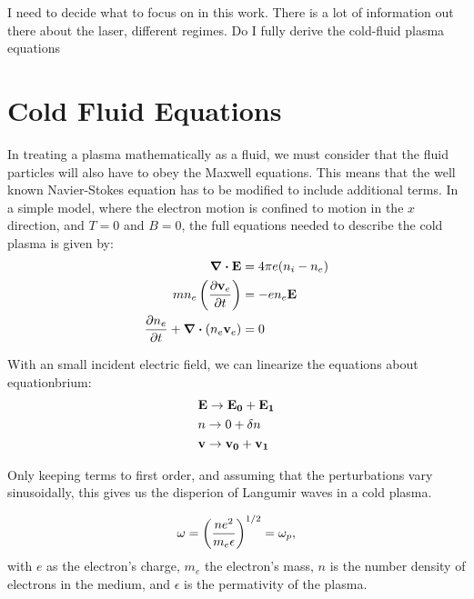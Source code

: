 \documentclass[12pt, titlepage]{article}
\begin{document}
I need to decide what to focus on in this work. There is a lot of information out there about the laser, different regimes. Do I fully derive the cold-fluid plasma equations
\section{Cold Fluid Equations}

In treating a plasma mathematically as a fluid, we must consider that the fluid particles
will also have to obey the Maxwell equations. This means that the well known Navier-Stokes
equation has to be modified to include additional terms. In a simple model, where the electron
motion is confined to motion in the $x$ direction, and $T=0$ and $B=0$, the full equations
needed to describe the cold plasma is given by:
\begin{subequations}
    \begin{align}
        \div{\vb{E}} & = 4 \pi e \qty(n_i-n_e) \\
    m n_e \left( \pdv{\vb{v}_e}{t} \right) &= -e n_e \vb{E} \\
        \pdv{n_e}{t} + \div{ \qty(n_e \vb{v}_e)} & = 0\\
    \end{align}
\end{subequations}

With an small incident electric field, we can linearize the equations about
equationbrium:
\begin{align*}
    &\vb{E} \rightarrow \vb{E_0} + \vb{E_1}\\
    &n \rightarrow 0 + \delta n \\
    &\vb{v} \rightarrow \vb{v_0} + \vb{v_1}
\end{align*}

Only keeping terms to first order, and assuming that the perturbations vary sinusoidally,
this gives us the disperion of Langumir waves in a cold plasma. 

\begin{equation}
\label{eq:dispersion}
\omega = \qty(\frac{ne^2}{m_e \epsilon})^{1/2} = \omega_p,
\end{equation}
with $e$ as the electron's charge, $m_e$ the electron's mass, $n$ is the number
density of electrons in the medium, and $\epsilon$ is the permativity of the plasma.
\end{document}
